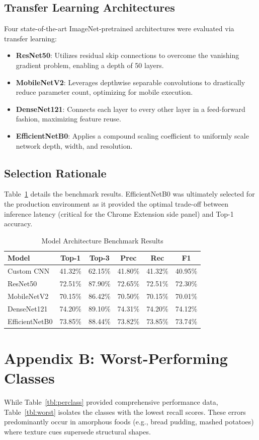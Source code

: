 \documentclass[conference]{IEEEtran}
\begin{document}
\subsection{Transfer Learning Architectures}
Four state-of-the-art ImageNet-pretrained architectures were evaluated via transfer learning:
\begin{itemize}
    \item \textbf{ResNet50}: Utilizes residual skip connections to overcome the vanishing gradient problem, enabling a depth of 50 layers.
    \item \textbf{MobileNetV2}: Leverages depthwise separable convolutions to drastically reduce parameter count, optimizing for mobile execution.
    \item \textbf{DenseNet121}: Connects each layer to every other layer in a feed-forward fashion, maximizing feature reuse.
    \item \textbf{EfficientNetB0}: Applies a compound scaling coefficient to uniformly scale network depth, width, and resolution.
\end{itemize}

\subsection{Selection Rationale}
Table~\ref{tbl:appendix_bench} details the benchmark results. EfficientNetB0 was ultimately selected for the production environment as it provided the optimal trade-off between inference latency (critical for the Chrome Extension side panel) and Top-1 accuracy.

\begin{table}[ht]
\centering
\caption{Model Architecture Benchmark Results}
\label{tbl:appendix_bench}
\small
\begin{tabular}{lccccc}
\toprule
Model & Top-1 & Top-3 & Prec & Rec & F1 \\
\midrule
Custom CNN & 41.32\% & 62.15\% & 41.80\% & 41.32\% & 40.95\% \\
ResNet50 & 72.51\% & 87.90\% & 72.65\% & 72.51\% & 72.30\% \\
MobileNetV2 & 70.15\% & 86.42\% & 70.50\% & 70.15\% & 70.01\% \\
DenseNet121 & 74.20\% & 89.10\% & 74.31\% & 74.20\% & 74.12\% \\
EfficientNetB0 & 73.85\% & 88.44\% & 73.82\% & 73.85\% & 73.74\% \\
\bottomrule
\end{tabular}
\end{table}

\section*{Appendix B: Worst-Performing Classes}
While Table~\ref{tbl:perclass} provided comprehensive performance data, Table~\ref{tbl:worst} isolates the classes with the lowest recall scores. These errors predominantly occur in amorphous foods (e.g., bread pudding, mashed potatoes) where texture cues supersede structural shapes.



\nocite{*}


\end{document}
